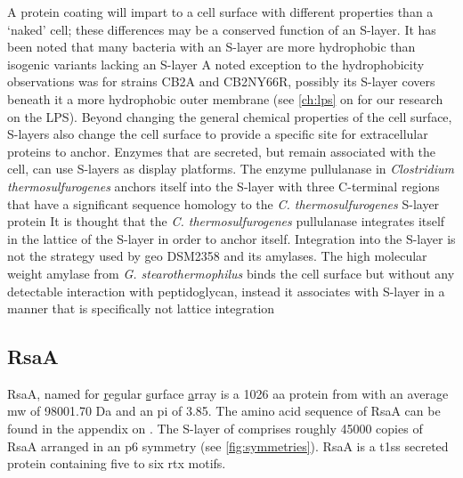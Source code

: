 A protein coating will impart to a cell surface with different properties than a `naked' cell; these differences may be a conserved function of an \ac{S-layer}. It has been noted
that many bacteria with an \ac{S-layer} are more hydrophobic than isogenic variants lacking an \ac{S-layer} A noted exception to the hydrophobicity
observations was for \caulobacter strains CB2A and CB2NY66R, possibly its \ac{S-layer} covers beneath it a more hydrophobic outer membrane (see \cref{ch:lps} on 
for our research on the \caulobacter \ac{LPS}). Beyond changing the general chemical properties of the cell surface, \acp{S-layer} also change the cell surface to provide a
specific site for extracellular proteins to anchor. Enzymes that are secreted, but remain associated with the cell, can use \acp{S-layer} as display platforms. The enzyme
pullulanase in \textit{Clostridium thermosulfurogenes} anchors itself into the \ac{S-layer} with three C-terminal regions that have a significant sequence homology to the
\textit{C. thermosulfurogenes} \ac{S-layer} protein It is thought that the \textit{C. thermosulfurogenes} pullulanase integrates itself in the
lattice of the \ac{S-layer} in order to anchor itself. Integration into the \ac{S-layer} is not the strategy used by \ac{geo} DSM2358 and its amylases. The high molecular weight
amylase from \textit{G. stearothermophilus} binds the cell surface but without any detectable interaction with peptidoglycan, instead it associates with \ac{S-layer} in a manner
that is specifically not lattice integration


\subsection{RsaA} \label{sec:intro-rsaa}

RsaA, named for \underline{r}egular \underline{s}urface \underline{a}rray is a 1026 \ac{aa} protein from \caulobacter with an average \ac{mw}
of 98001.70 Da and an \ac{pi} of 3.85. The amino acid sequence of RsaA can be found in the appendix on . The \ac{S-layer} of \caulobacter comprises roughly
45000 copies of RsaA arranged in an p6 symmetry (see \cref{fig:symmetries}). RsaA is a \ac{t1ss} secreted protein containing five to six \ac{rtx} motifs.

